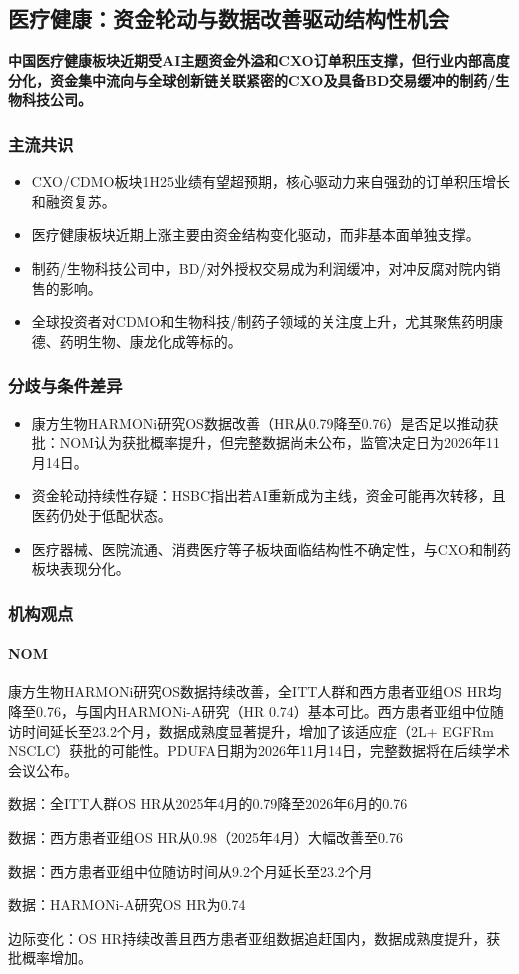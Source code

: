 \documentclass[11pt]{ctexart}
\begin{document}
\subsection{医疗健康：资金轮动与数据改善驱动结构性机会}
\textbf{中国医疗健康板块近期受AI主题资金外溢和CXO订单积压支撑，但行业内部高度分化，资金集中流向与全球创新链关联紧密的CXO及具备BD交易缓冲的制药/生物科技公司。}
\subsubsection*{主流共识}
\begin{itemize}
  \item CXO/CDMO板块1H25业绩有望超预期，核心驱动力来自强劲的订单积压增长和融资复苏。
  \item 医疗健康板块近期上涨主要由资金结构变化驱动，而非基本面单独支撑。
  \item 制药/生物科技公司中，BD/对外授权交易成为利润缓冲，对冲反腐对院内销售的影响。
  \item 全球投资者对CDMO和生物科技/制药子领域的关注度上升，尤其聚焦药明康德、药明生物、康龙化成等标的。
\end{itemize}
\subsubsection*{分歧与条件差异}
\begin{itemize}
  \item 康方生物HARMONi研究OS数据改善（HR从0.79降至0.76）是否足以推动获批：NOM认为获批概率提升，但完整数据尚未公布，监管决定日为2026年11月14日。
  \item 资金轮动持续性存疑：HSBC指出若AI重新成为主线，资金可能再次转移，且医药仍处于低配状态。
  \item 医疗器械、医院流通、消费医疗等子板块面临结构性不确定性，与CXO和制药板块表现分化。
\end{itemize}
\subsubsection*{机构观点}
\paragraph{NOM} 康方生物HARMONi研究OS数据持续改善，全ITT人群和西方患者亚组OS HR均降至0.76，与国内HARMONi-A研究（HR 0.74）基本可比。西方患者亚组中位随访时间延长至23.2个月，数据成熟度显著提升，增加了该适应症（2L+ EGFRm NSCLC）获批的可能性。PDUFA日期为2026年11月14日，完整数据将在后续学术会议公布。
{\small\color{refgray}数据：全ITT人群OS HR从2025年4月的0.79降至2026年6月的0.76\par}
{\small\color{refgray}数据：西方患者亚组OS HR从0.98（2025年4月）大幅改善至0.76\par}
{\small\color{refgray}数据：西方患者亚组中位随访时间从9.2个月延长至23.2个月\par}
{\small\color{refgray}数据：HARMONi-A研究OS HR为0.74\par}
{\small\color{refgray}边际变化：OS HR持续改善且西方患者亚组数据追赶国内，数据成熟度提升，获批概率增加。\par}
\end{document}

